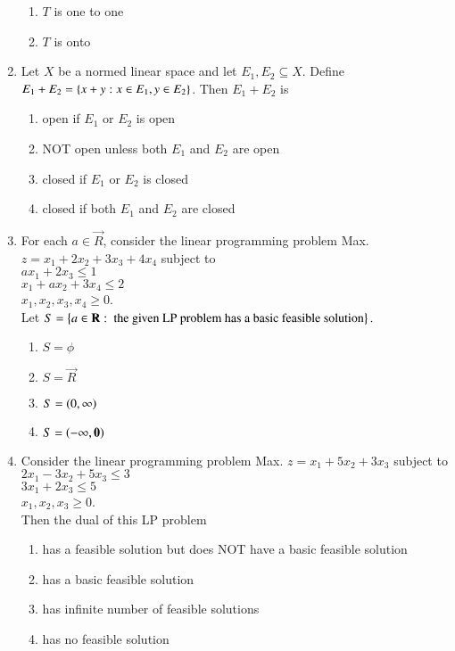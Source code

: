 \documentclass[journal,12pt,onecolumn]{IEEEtran}
\theoremstyle{remark}
\begin{document}
\begin{enumerate}
\begin{enumerate}
        \item $T$ is one to one
        \item $T$ is onto
    \end{enumerate}
    \item Let $X$ be a normed linear space and let $E_1,E_2 \subseteq X$. Define $E_1+E_2=\left\{x+y:x \in E_1,y\in E_2\right\}$. Then $E_1+E_2$ is
    \begin{enumerate}
        \item open if $E_1$ or $E_2$ is open
        \item NOT open unless both $E_1$ and $E_2$ are open
        \item closed if $E_1$ or $E_2$ is closed
        \item closed if both $E_1$ and $E_2$ are closed
    \end{enumerate}
    \item For each $a \in \vec{R}$, consider the linear programming problem Max. $z=x_1+2x_2+3x_3+4x_4$ subject to \\
    $ax_1+2x_3 \leq 1$\\
    $x_1+ax_2+3x_4 \leq 2$\\
    $x_1,x_2,x_3,x_4\geq0$.\\
    Let $S=\left\{a \in \mathbf{R}:\text{ the given LP problem has a basic feasible solution}\right\}.$
    \begin{enumerate}
        \item $S=\phi$
        \item $S=\vec{R}$
        \item $S=\left(0,\infty\right)$
        \item $S=\left(\mathbf{-\infty,0}\right)$
    \end{enumerate}
    \item Consider the linear programming problem Max. $z=x_1+5x_2+3x_3$ subject to\\
    $2x_1-3x_2+5x_3\leq3$\\
    $3x_1+2x_3\leq5$\\
    $x_1,x_2,x_3\geq0$.\\
    Then the dual of this LP problem
    \begin{enumerate}
        \item has a feasible solution but does NOT have a basic feasible solution 
        \item has a basic feasible solution
        \item has infinite number of feasible solutions
        \item has no feasible solution

\end{enumerate}
\end{enumerate}
\end{document}
